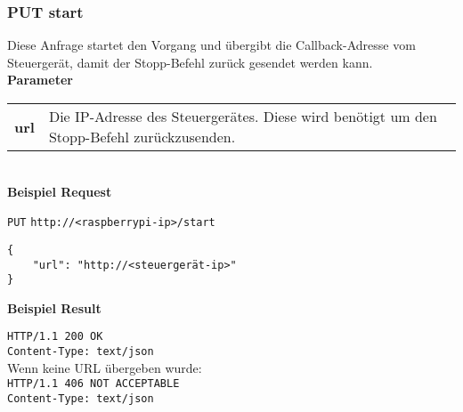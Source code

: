 \subsubsection{PUT start}

Diese Anfrage startet den Vorgang und übergibt die Callback-Adresse vom Steuergerät, damit der Stopp-Befehl zurück gesendet werden kann.\\

\textbf{Parameter}

\begin{tabular}{l p{16cm}}
	\textbf{url} & Die IP-Adresse des Steuergerätes. Diese wird benötigt um den Stopp-Befehl zurückzusenden.
\end{tabular}\\

\textbf{Beispiel Request}

\texttt{PUT} 
\texttt{http://<raspberrypi-ip>/start}

\begin{lstlisting}[caption=PUT start Request, tabsize=2]
{
	"url": "http://<steuergerät-ip>"
}
\end{lstlisting}

\textbf{Beispiel Result}

\texttt{HTTP/1.1 200 OK} \\
\texttt{Content-Type: text/json} \\

\noindent
Wenn keine URL übergeben wurde: \\

\noindent
\texttt{HTTP/1.1 406 NOT ACCEPTABLE} \\
\texttt{Content-Type: text/json}